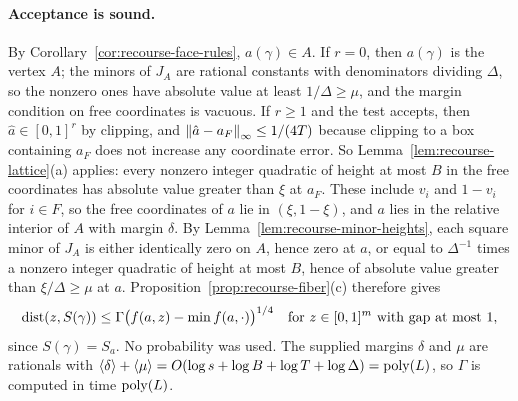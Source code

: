 \paragraph{Acceptance is sound.}
By Corollary~\ref{cor:recourse-face-rules}, $a(\gamma)\in A$. If $r=0$,
then $a(\gamma)$ is the vertex $A$; the minors of $J_A$ are rational
constants with denominators dividing $\Delta$, so the nonzero ones have
absolute value at least $1/\Delta\ge\mu$, and the margin condition on
free coordinates is vacuous. If $r\ge1$ and the test accepts, then
$\hat a\in[0,1]^r$ by clipping, and $\left\lVert\hat a-a_F\right\rVert_\infty\le1/(4T)$
because clipping to a box containing $a_F$ does not increase any
coordinate error. So Lemma~\ref{lem:recourse-lattice}(a) applies: every
nonzero integer quadratic of height at most $B$ in the free coordinates
has absolute value greater than $\xi$ at $a_F$. These
include $v_i$ and $1-v_i$ for $i\in F$, so the free coordinates of $a$
lie in $(\xi,1-\xi)$, and $a$ lies in the relative interior of $A$ with
margin $\delta$. By Lemma~\ref{lem:recourse-minor-heights}, each square
minor of $J_A$ is either identically zero on $A$, hence zero at $a$, or
equal to $\Delta^{-1}$ times a nonzero integer quadratic of height at
most $B$, hence of absolute value greater than $\xi/\Delta\ge\mu$ at $a$.
Proposition~\ref{prop:recourse-fiber}(c) therefore gives
\begin{equation}
 \operatorname{dist}(z,S(\gamma))\le\Gamma\bigl(f(a,z)-\min f(a,\cdot)\bigr)^{1/4}
 \quad\text{for } z\in[0,1]^m \text{ with gap at most } 1,
 \label{eq:recourse-accepted-bound}
\end{equation}
since $S(\gamma)=S_a$. No probability was used. The supplied margins
$\delta$ and $\mu$ are rationals with
$\langle\delta\rangle+\langle\mu\rangle=O(\log s+\log B+\log T+\log\Delta)
=\operatorname{poly}(L)$, so $\Gamma$ is computed in time $\operatorname{poly}(L)$.

